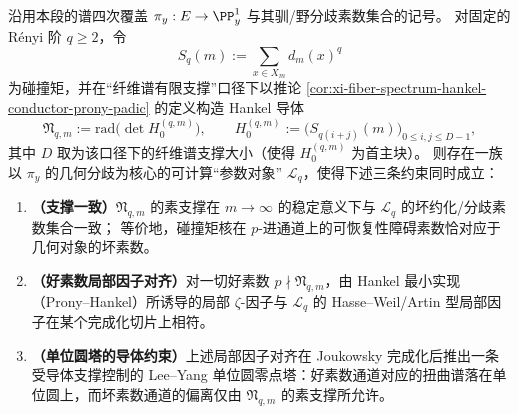 \begin{conjecture}\label{conj:xi-langlands-leyang-hankel-conductor-ramification}
沿用本段的谱四次覆盖 \(\pi_y:E\to\PP^1_y\) 与其驯/野分歧素数集合的记号。
对固定的 Rényi 阶 \(q\ge 2\)，令
\[
S_q(m):=\sum_{x\in X_m} d_m(x)^q
\]
为碰撞矩，并在“纤维谱有限支撑”口径下以推论 \ref{cor:xi-fiber-spectrum-hankel-conductor-prony-padic} 的定义构造 Hankel 导体
\[
\mathfrak N_{q,m}:=\mathrm{rad}\bigl(\det H_0^{(q,m)}\bigr),
\qquad
H_0^{(q,m)}:=\bigl(S_{q(i+j)}(m)\bigr)_{0\le i,j\le D-1},
\]
其中 \(D\) 取为该口径下的纤维谱支撑大小（使得 \(H_0^{(q,m)}\) 为首主块）。
则存在一族以 \(\pi_y\) 的几何分歧为核心的可计算“参数对象” \(\mathcal L_{q}\)，使得下述三条约束同时成立：
\begin{enumerate}
  \item \textbf{（支撑一致）}\(\mathfrak N_{q,m}\) 的素支撑在 \(m\to\infty\) 的稳定意义下与 \(\mathcal L_q\) 的坏约化/分歧素数集合一致；
  等价地，碰撞矩核在 \(p\)-进通道上的可恢复性障碍素数恰对应于几何对象的坏素数。
  \item \textbf{（好素数局部因子对齐）}对一切好素数 \(p\nmid \mathfrak N_{q,m}\)，由 Hankel 最小实现（Prony--Hankel）所诱导的局部 \(\zeta\)-因子与 \(\mathcal L_q\) 的 Hasse--Weil/Artin 型局部因子在某个完成化切片上相符。
  \item \textbf{（单位圆塔的导体约束）}上述局部因子对齐在 Joukowsky 完成化后推出一条受导体支撑控制的 Lee--Yang 单位圆零点塔：好素数通道对应的扭曲谱落在单位圆上，而坏素数通道的偏离仅由 \(\mathfrak N_{q,m}\) 的素支撑所允许。
\end{enumerate}
\end{conjecture}

